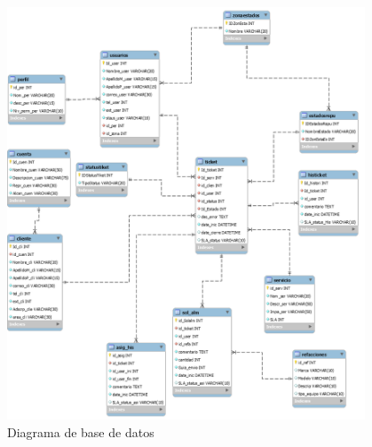 \begin{figure}[H]
	\centering
	\includegraphics[width=0.95\textwidth]{Capitulo4/Diagramas/BaseDatos}
	\caption{Diagrama de base de datos}
	\label{fig:BDGENRAL}
\end{figure}
